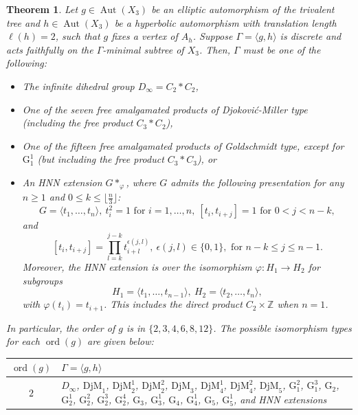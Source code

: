 \documentclass[12pt,leqno]{amsart}
\newcommand{\2}{L^2_{\rm per}(0, T)}
\newtheorem{thm}{Theorem}[section]
\newcommand{\aut}{{\operatorname{Aut}}}
\newcommand{\ord}{{\operatorname{ord}}}
\numberwithin{equation}{section}
\numberwithin{figure}{section}
\begin{document}
\begin{thm}\label{thm:classification}
    Let $g\in\aut(X_3)$ be an elliptic automorphism of the trivalent tree and $h\in \aut(X_3)$ be a hyperbolic automorphism with translation length $\ell(h) = 2$, such that $g$ fixes a vertex of $A_h$. Suppose $\Gamma = \langle g,h\rangle$ is discrete and acts faithfully on the $\Gamma$-minimal subtree of $X_3$. Then, $\Gamma$ must be one of the following:
    \begin{itemize}
        \item The infinite dihedral group $D_\infty = C_2*C_2$,
        \item One of the seven free amalgamated products of Djokovi\'c-Miller type (including the free product $C_3*C_2$),
        \item One of the fifteen free amalgamated products of Goldschmidt type, except for $\mathrm{G}_1^1$ (but including the free product $C_3*C_3$), or
        \item An HNN extension $G*_\varphi$, where $G$ admits the following presentation for any $n\geq 1$ and $0\leq k\leq \lfloor\frac{n}{3}\rfloor$:
        \[
        G = \langle t_1,\dots, t_n\rangle,\ t_i^2 = 1 \text{ for }i=1,\dots, n,\ [t_i,t_{i+j}] = 1\text{ for } 0<j<n-k,
        \]
        and
        \[
        [t_i,t_{i+j}] = \prod_{l=k}^{j-k}t_{i+l}^{\epsilon(j,l)},\ \epsilon(j,l)\in\{0,1\},\text{ for }n-k\leq j\leq n-1.
        \]
        Moreover, the HNN extension is over the isomorphism $\varphi: H_1\to H_2$ for subgroups
        \[
        H_1 = \langle t_1,\dots, t_{n-1}\rangle,\ H_2 = \langle t_2,\dots, t_{n}\rangle,
        \]
        with $\varphi(t_i) = t_{i+1}$. This includes the direct product $C_2\times \mathbb{Z}$ when $n = 1$.
    \end{itemize}
    In particular, the order of $g$ is in $\{2,3,4,6,8,12\}$. The possible isomorphism types for each $\ord(g)$ are given below:
    \begin{center}
        \begin{tabular}{c|p{12cm}}
            $\ord(g)$ & $\Gamma = \langle g,h\rangle$ \\
            \hline
            $2$ & $D_\infty$, $\mathrm{DjM}_1$, $\mathrm{DjM}_2^1$, $\mathrm{DjM}_2^2$, $\mathrm{DjM}_3$, $\mathrm{DjM}_4^1$, $\mathrm{DjM}_4^2$, $\mathrm{DjM}_5$, $\mathrm{G}_1^2$, $\mathrm{G}_1^3$, $\mathrm{G}_2$, $\mathrm{G}_2^1$, $\mathrm{G}_2^2$, $\mathrm{G}_2^3$, $\mathrm{G}_2^4$, $\mathrm{G}_3$, $\mathrm{G}_3^1$, $\mathrm{G}_4$, $\mathrm{G}_4^1$, $\mathrm{G}_5$, $\mathrm{G}_5^1$, and HNN extensions \\

\end{tabular}
\end{center}
\end{thm}
\end{document}
